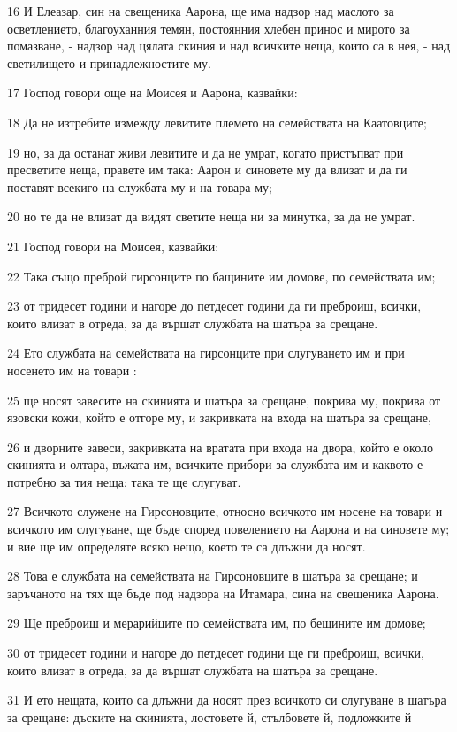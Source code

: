 \par 16 И Елеазар, син на свещеника Аарона, ще има надзор над маслото за осветлението, благоуханния темян, постоянния хлебен принос и мирото за помазване, - надзор над цялата скиния и над всичките неща, които са в нея, - над светилището и принадлежностите му.
\par 17 Господ говори още на Моисея и Аарона, казвайки:
\par 18 Да не изтребите измежду левитите племето на семействата на Каатовците;
\par 19 но, за да останат живи левитите и да не умрат, когато пристъпват при пресветите неща, правете им така: Аарон и синовете му да влизат и да ги поставят всекиго на службата му и на товара му;
\par 20 но те да не влизат да видят светите неща ни за минутка, за да не умрат.
\par 21 Господ говори на Моисея, казвайки:
\par 22 Така също преброй гирсонците по бащините им домове, по семействата им;
\par 23 от тридесет години и нагоре до петдесет години да ги преброиш, всички, които влизат в отреда, за да вършат службата на шатъра за срещане.
\par 24 Ето службата на семействата на гирсонците при слугуването им и при носенето им на товари :
\par 25 ще носят завесите на скинията и шатъра за срещане, покрива му, покрива от язовски кожи, който е отгоре му, и закривката на входа на шатъра за срещане,
\par 26 и дворните завеси, закривката на вратата при входа на двора, който е около скинията и олтара, въжата им, всичките прибори за службата им и каквото е потребно за тия неща; така те ще слугуват.
\par 27 Всичкото служене на Гирсоновците, относно всичкото им носене на товари и всичкото им слугуване, ще бъде според повелението на Аарона и на синовете му; и вие ще им определяте всяко нещо, което те са длъжни да носят.
\par 28 Това е службата на семействата на Гирсоновците в шатъра за срещане; и заръчаното на тях ще бъде под надзора на Итамара, сина на свещеника Аарона.
\par 29 Ще преброиш и мерарийците по семействата им, по бещините им домове;
\par 30 от тридесет години и нагоре до петдесет години ще ги преброиш, всички, които влизат в отреда, за да вършат службата на шатъра за срещане.
\par 31 И ето нещата, които са длъжни да носят през всичкото си слугуване в шатъра за срещане: дъските на скинията, лостовете й, стълбовете й, подложките й
